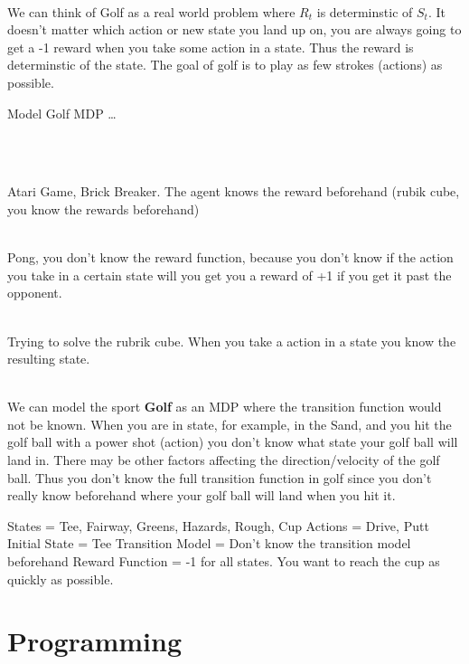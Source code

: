 \documentclass[12pt]{article}
\newenvironment{problem}[2][Problem]{\begin{trivlist}
\item[\hskip \labelsep {\bfseries #1}\hskip \labelsep {\bfseries #2.}]}{\end{trivlist}}
\begin{document}
\begin{problem}{15}
\text{ }\\
We can think of Golf as a real world problem where $R_t$ is determinstic of $S_t$. It doesn't matter which action or new state you land up on,
you are always going to get a -1 reward when you take some action in a state. Thus the reward is determinstic of the state. The goal of golf
is to play as few strokes (actions) as possible.

Model Golf MDP \dots
\end{problem}

\begin{problem}{16}
\text{ }\\
\end{problem}

\begin{problem}{17}
\text{ }\\
Atari Game, Brick Breaker. The agent knows the reward beforehand (rubik cube, you know the rewards beforehand)
\end{problem}

\begin{problem}{18}
\text{ }\\
Pong, you don't know the reward function, because you don't know if the action you take in a certain state will you get you a reward of +1 if you get
it past the opponent.
\end{problem}

\begin{problem}{19}
\text{ }\\
Trying to solve the rubrik cube. When you take a action in a state you know the resulting state.
\end{problem}

\begin{problem}{20}
\text{ }\\

We can model the sport \textbf{Golf} as an MDP where the transition function would not be known. When you are in state, for example,
in the Sand, and you hit the golf ball with a power shot (action) you don't know what state your golf ball will land in. There may be other factors affecting
the direction/velocity of the golf ball. Thus you don't know the full transition function in golf since you don't really know beforehand
where your golf ball will land when you hit it.

States = {Tee, Fairway, Greens, Hazards, Rough, Cup}
Actions = {Drive, Putt}
Initial State = Tee
Transition Model = Don't know the transition model beforehand
Reward Function = -1 for all states. You want to reach the cup as quickly as possible.

\end{problem}

\section*{Programming}

\begin{problem}{1}
\text{ }\\
\end{problem}
\end{document}
